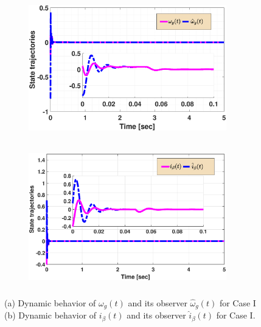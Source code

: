 \documentclass[preprint,11pt]{elsarticle}
\begin{document}
\begin{figure}[!ht]
    \begin{subfigure}[b]{0.5\textwidth}
    \centerline{\includegraphics[width=8.6cm,height=6cm]{x1.eps}}
    \caption{ }
    \end{subfigure}
    \begin{subfigure}[b]{0.5\textwidth}
    \centerline{\includegraphics[width=8.6cm,height=6cm]{x2.eps}}
    \caption{ }
    \end{subfigure}
    \caption{(a) Dynamic behavior of $\omega_g(t)$ and its observer $\hat{\omega}_g(t)$ for Case I  (b) Dynamic behavior of $i_\beta(t)$ and its observer $\hat{i}_\beta(t)$ for Case I.} \label{F1}
    \end{figure}
\end{document}
